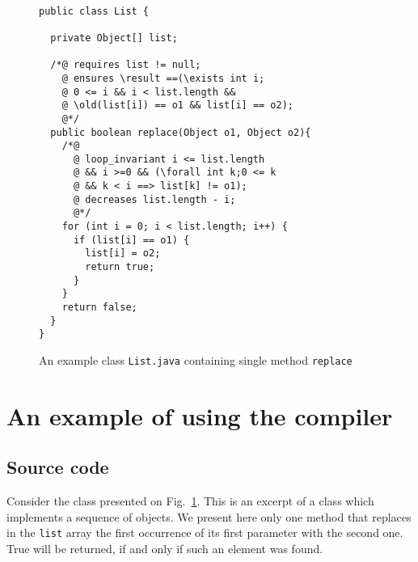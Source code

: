 \documentclass{llncs}
\begin{document}
\begin{figure}[htbp]
\vspace{-2\baselineskip}
~\hspace{2cm}\begin{minipage}{400pt}
\begin{lstlisting}
public class List {

  private Object[] list;

  /*@ requires list != null;
    @ ensures \result ==(\exists int i;
    @ 0 <= i && i < list.length &&
    @ \old(list[i]) == o1 && list[i] == o2);
    @*/
  public boolean replace(Object o1, Object o2){
    /*@
      @ loop_invariant i <= list.length
      @ && i >=0 && (\forall int k;0 <= k
      @ && k < i ==> list[k] != o1);
      @ decreases list.length - i;
      @*/
    for (int i = 0; i < list.length; i++) {
      if (list[i] == o1) {
        list[i] = o2;
        return true;
      }
    }
    return false;
  }
}
\end{lstlisting}
\end{minipage}
\caption{An example class \texttt{List.java} containing single method
\texttt{replace}}
\label{fig:source}
\end{figure}

\vspace{-2.5\baselineskip}

\section{An example of using the compiler}
\label{sec:example}

\vspace{-0.5\baselineskip}

\subsection{Source code}

Consider the class presented on Fig.~\ref{fig:source}. This is an
excerpt of a class which implements a sequence of objects. We present
here only one method that replaces in the \texttt{list} array the
first occurrence of its first parameter with the second one. True will
be returned, if and only if such an element was found.
\end{document}
